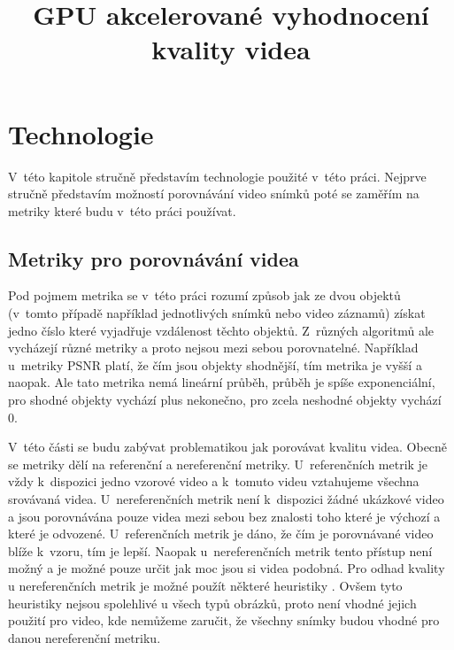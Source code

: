\documentclass[thesis=M,czech]{FITthesis}[2016/06/26]
\title{GPU akcelerované vyhodnocení kvality videa}
\begin{document}

\begin{introduction}
\end{introduction}
\chapter{Technologie}
V~této kapitole stručně představím technologie použité v~této práci. Nejprve stručně představím možností porovnávání video snímků poté se zaměřím na metriky které budu v~této práci používat.
\section{Metriky pro porovnávání videa}
Pod pojmem metrika se v~této práci rozumí způsob jak ze dvou objektů (v~tomto případě například jednotlivých snímků nebo video záznamů) získat jedno číslo které vyjadřuje vzdálenost těchto objektů. Z~různých algoritmů ale vycházejí různé metriky a proto nejsou mezi sebou porovnatelné. Například u~metriky PSNR platí, že čím jsou objekty shodnější, tím metrika je vyšší a naopak. Ale tato metrika nemá lineární průběh, průběh je spíše exponenciální, pro shodné objekty vychází plus nekonečno, pro zcela neshodné objekty vychází 0.

V~této části se budu zabývat problematikou jak porovávat kvalitu videa. Obecně se metriky dělí na referenční a nereferenční metriky. U~referenčních metrik je vždy k~dispozici jedno vzorové video a k~tomuto videu vztahujeme všechna srovávaná videa. U~nereferenčních metrik není k~dispozici žádné ukázkové video a jsou porovnávána pouze videa mezi sebou bez znalosti toho které je výchozí a které je odvozené.
U~referenčních metrik je dáno, že čím je porovnávané video blíže k~vzoru, tím je lepší. Naopak u~nereferenčních metrik tento přístup není možný a je možné pouze určit jak moc jsou si videa podobná. Pro odhad kvality u nereferenčních metrik je možné použít některé heuristiky \cite{nonref}. Ovšem tyto heuristiky nejsou spolehlivé u všech typů obrázků, proto není vhodné jejich použití pro video, kde nemůžeme zaručit, že všechny snímky budou vhodné pro danou nereferenční metriku.
\end{document}
